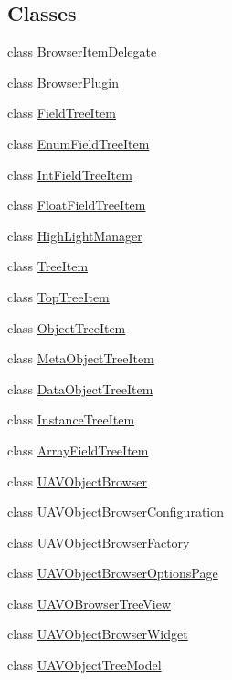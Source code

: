 \subsection*{Classes}
\begin{DoxyCompactItemize}
\item 
class \hyperlink{class_browser_item_delegate}{Browser\-Item\-Delegate}
\item 
class \hyperlink{class_browser_plugin}{Browser\-Plugin}
\item 
class \hyperlink{class_field_tree_item}{Field\-Tree\-Item}
\item 
class \hyperlink{class_enum_field_tree_item}{Enum\-Field\-Tree\-Item}
\item 
class \hyperlink{class_int_field_tree_item}{Int\-Field\-Tree\-Item}
\item 
class \hyperlink{class_float_field_tree_item}{Float\-Field\-Tree\-Item}
\item 
class \hyperlink{class_high_light_manager}{High\-Light\-Manager}
\item 
class \hyperlink{class_tree_item}{Tree\-Item}
\item 
class \hyperlink{class_top_tree_item}{Top\-Tree\-Item}
\item 
class \hyperlink{class_object_tree_item}{Object\-Tree\-Item}
\item 
class \hyperlink{class_meta_object_tree_item}{Meta\-Object\-Tree\-Item}
\item 
class \hyperlink{class_data_object_tree_item}{Data\-Object\-Tree\-Item}
\item 
class \hyperlink{class_instance_tree_item}{Instance\-Tree\-Item}
\item 
class \hyperlink{class_array_field_tree_item}{Array\-Field\-Tree\-Item}
\item 
class \hyperlink{class_u_a_v_object_browser}{U\-A\-V\-Object\-Browser}
\item 
class \hyperlink{class_u_a_v_object_browser_configuration}{U\-A\-V\-Object\-Browser\-Configuration}
\item 
class \hyperlink{class_u_a_v_object_browser_factory}{U\-A\-V\-Object\-Browser\-Factory}
\item 
class \hyperlink{class_u_a_v_object_browser_options_page}{U\-A\-V\-Object\-Browser\-Options\-Page}
\item 
class \hyperlink{class_u_a_v_o_browser_tree_view}{U\-A\-V\-O\-Browser\-Tree\-View}
\item 
class \hyperlink{class_u_a_v_object_browser_widget}{U\-A\-V\-Object\-Browser\-Widget}
\item 
class \hyperlink{class_u_a_v_object_tree_model}{U\-A\-V\-Object\-Tree\-Model}
\end{DoxyCompactItemize}
